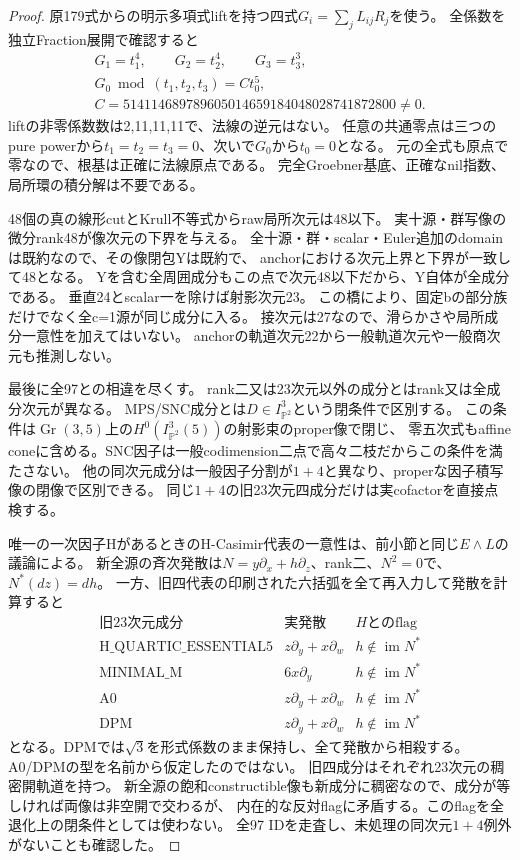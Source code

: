 \documentclass[a4paper,11pt]{ltjsarticle}
\theoremstyle{definition}
\begin{document}
\begin{proof}
原179式からの明示多項式liftを持つ四式$G_i=\sum_jL_{ij}R_j$を使う。
全係数を独立Fraction展開で確認すると
\[
 \begin{gathered}
 G_1=t_1^4,\qquad G_2=t_2^4,\qquad G_3=t_3^3,\\
 G_0\bmod(t_1,t_2,t_3)=Ct_0^5,\\
 C=514114689789605014659184048028741872800\ne0.
 \end{gathered}
\]
liftの非零係数数は2,11,11,11で、法線の逆元はない。
任意の共通零点は三つのpure powerから$t_1=t_2=t_3=0$、次いで$G_0$から$t_0=0$となる。
元の全式も原点で零なので、根基は正確に法線原点である。
完全Groebner基底、正確なnil指数、局所環の積分解は不要である。

48個の真の線形cutとKrull不等式からraw局所次元は48以下。
実十源・群写像の微分rank48が像次元の下界を与える。
全十源・群・scalar・Euler追加のdomainは既約なので、その像閉包Yは既約で、
anchorにおける次元上界と下界が一致して48となる。
Yを含む全周囲成分もこの点で次元48以下だから、Y自体が全成分である。
垂直24とscalar一を除けば射影次元23。
この橋により、固定bの部分族だけでなく全c=1源が同じ成分に入る。
接次元は27なので、滑らかさや局所成分一意性を加えてはいない。
anchorの軌道次元22から一般軌道次元や一般商次元も推測しない。

最後に全97との相違を尽くす。
rank二又は23次元以外の成分とはrank又は全成分次元が異なる。
MPS/SNC成分とは$D\in I_{\mathbb P^2}^3$という閉条件で区別する。
この条件は$\operatorname{Gr}(3,5)$上の$H^0(I_{\mathbb P^2}^3(5))$の射影束のproper像で閉じ、
零五次式もaffine coneに含める。SNC因子は一般codimension二点で高々二枝だからこの条件を満たさない。
他の同次元成分は一般因子分割が$1+4$と異なり、properな因子積写像の閉像で区別できる。
同じ$1+4$の旧23次元四成分だけは実cofactorを直接点検する。

唯一の一次因子HがあるときのH-Casimir代表の一意性は、前小節と同じ$E\wedge L$の議論による。
新全源の斉次発散は$N=y\partial_x+h\partial_z$、rank二、$N^2=0$で、$N^*(dz)=dh$。
一方、旧四代表の印刷された六括弧を全て再入力して発散を計算すると
\[
\begin{array}{c|c|c}
 \text{旧23次元成分}&\text{実発散}&H\text{とのflag}\\\hline
 \mathrm{H\_QUARTIC\_ESSENTIAL5}&z\partial_y+x\partial_w&h\notin\operatorname{im}N^*\\
 \mathrm{MINIMAL\_M}&6x\partial_y&h\notin\operatorname{im}N^*\\
 \mathrm{A0}&z\partial_y+x\partial_w&h\notin\operatorname{im}N^*\\
 \mathrm{DPM}&z\partial_y+x\partial_w&h\notin\operatorname{im}N^*
\end{array}
\]
となる。DPMでは$\sqrt3$を形式係数のまま保持し、全て発散から相殺する。
A0/DPMの型を名前から仮定したのではない。
旧四成分はそれぞれ23次元の稠密開軌道を持つ。
新全源の飽和constructible像も新成分に稠密なので、成分が等しければ両像は非空開で交わるが、
内在的な反対flagに矛盾する。このflagを全退化上の閉条件としては使わない。
全97 IDを走査し、未処理の同次元$1+4$例外がないことも確認した。
\end{proof}
\end{document}
